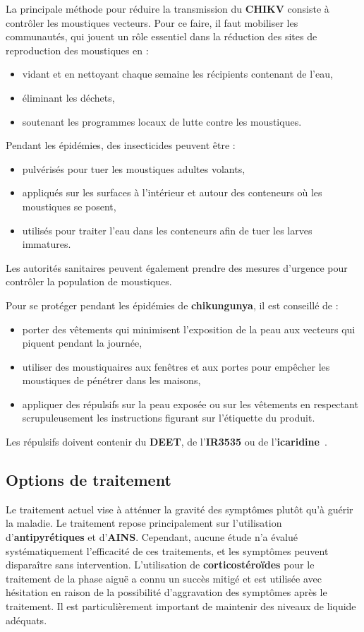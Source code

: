 La principale méthode pour réduire la transmission du \textbf{CHIKV} consiste à contrôler les moustiques vecteurs. Pour ce faire, il faut mobiliser les communautés, qui jouent un rôle essentiel dans la réduction des sites de reproduction des moustiques en :

\begin{itemize}
	\item vidant et en nettoyant chaque semaine les récipients contenant de l'eau,
	\item éliminant les déchets,
	\item soutenant les programmes locaux de lutte contre les moustiques.
\end{itemize}

Pendant les épidémies, des insecticides peuvent être :

\begin{itemize}
	\item pulvérisés pour tuer les moustiques adultes volants,
	\item appliqués sur les surfaces à l'intérieur et autour des conteneurs où les moustiques se posent,
	\item utilisés pour traiter l'eau dans les conteneurs afin de tuer les larves immatures.
\end{itemize}

Les autorités sanitaires peuvent également prendre des mesures d'urgence pour contrôler la population de moustiques.

Pour se protéger pendant les épidémies de \textbf{chikungunya}, il est conseillé de :

\begin{itemize}
	\item porter des vêtements qui minimisent l'exposition de la peau aux vecteurs qui piquent pendant la journée,
	\item utiliser des moustiquaires aux fenêtres et aux portes pour empêcher les moustiques de pénétrer dans les maisons,
	\item appliquer des répulsifs sur la peau exposée ou sur les vêtements en respectant scrupuleusement les instructions figurant sur l'étiquette du produit.
\end{itemize}

Les répulsifs doivent contenir du \textbf{DEET}, de l'\textbf{IR3535} ou de l'\textbf{icaridine}~\cite{WHO}.

\subsection{Options de traitement}
Le traitement actuel vise à atténuer la gravité des symptômes plutôt qu'à guérir la maladie. Le traitement repose principalement sur l'utilisation d'\textbf{antipyrétiques} et d'\textbf{AINS}. Cependant, aucune étude n'a évalué systématiquement l'efficacité de ces traitements, et les symptômes peuvent disparaître sans intervention. L'utilisation de \textbf{corticostéroïdes} pour le traitement de la phase aiguë a connu un succès mitigé et est utilisée avec hésitation en raison de la possibilité d'aggravation des symptômes après le traitement. Il est particulièrement important de maintenir des niveaux de liquide adéquats. 

